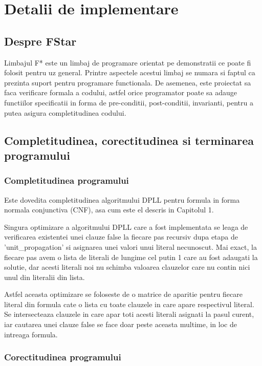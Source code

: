 \chapter{Detalii de implementare}


\section{Despre FStar}

Limbajul F* este un limbaj de programare orientat pe demonstratii ce poate fi folosit pentru uz general. Printre aspectele acestui limbaj se numara si faptul ca prezinta suport pentru programare functionala. De asemenea, este proiectat sa faca verificare formala a codului, astfel orice programator poate sa adauge functiilor specificatii in forma de pre-conditii, post-conditii, invarianti, pentru a putea asigura completitudinea codului.

\section{Completitudinea, corectitudinea si terminarea programului}

\subsection{Completitudinea programului}

Este dovedita completitudinea algoritmului DPLL pentru formula in forma normala conjunctiva (CNF), asa cum este el descris in Capitolul 1.

Singura optimizare a algoritmului DPLL care a fost implementata se leaga de verificarea existentei unei clauze false la fiecare pas recursiv dupa etapa de 'unit\_propagation' si asignarea unei valori unui literal necunoscut. Mai exact, la fiecare pas avem o lista de literali de lungime cel putin 1 care au fost adaugati la solutie, dar acesti literali noi nu schimba valoarea clauzelor care nu contin nici unul din literalii din lista.

Astfel aceasta optimizare se foloseste de o matrice de aparitie pentru fiecare literal din formula cate o lista cu toate clauzele in care apare respectivul literal. Se intersecteaza clauzele in care apar toti acesti literali asignati la pasul curent, iar cautarea unei clauze false se face doar peste aceasta multime, in loc de intreaga formula.

\subsection{Corectitudinea programului}

